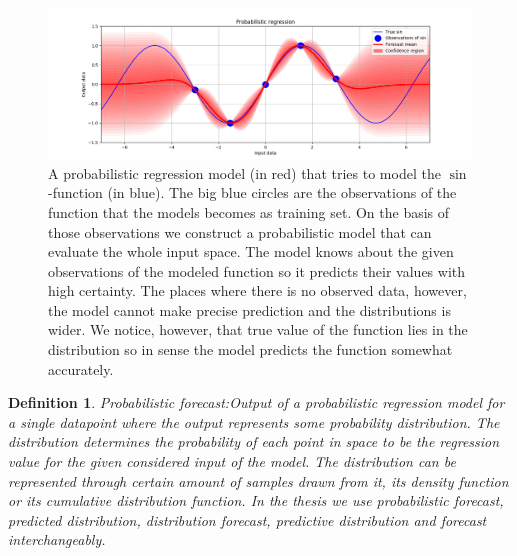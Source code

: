 \documentclass[12pt,a4paper,twoside]{scrartcl}
\newtheorem{definition}[theorem]{Definition}
\numberwithin{equation}{section}
\begin{document}
\vfill
\begin{figure}[ht]
  \centering
  \includegraphics[height=0.5\textwidth, width=1\textwidth]{figures/probabilistic_regression.png}
  \caption[Probabilistic regression example model]{A probabilistic regression model (in red) that tries to model the \(\sin\)-function (in blue). The big blue circles are the observations of the function that the models becomes as training set. On the basis of those observations we construct a probabilistic model that can evaluate the whole input space. The model knows about the given observations of the modeled function so it predicts their values with high certainty. The places where there is no observed data, however, the model cannot make precise prediction and the distributions is wider. We notice, however, that true value of the function lies in the distribution so in sense the model predicts the function somewhat accurately.}\label{fig:prob-regression}
\end{figure}
\vspace{-2cm}
\begin{definition}{Probabilistic forecast:}\label{def:prob-for}
  Output of a probabilistic regression model for a single datapoint where the output represents some probability distribution. The distribution determines the probability of each point in space to be the regression value for the given considered input of the model. The distribution can be represented through certain amount of samples drawn from it, its density function or its cumulative distribution function. In the thesis we use probabilistic forecast, predicted distribution, distribution forecast, predictive distribution and forecast interchangeably.
\end{definition}
\vfill
\end{document}
